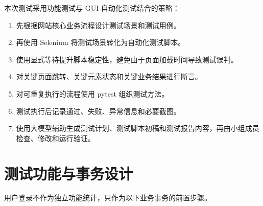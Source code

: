 \documentclass[UTF8,a4paper,12pt]{ctexart}
\begin{document}
本次测试采用功能测试与 GUI 自动化测试结合的策略：

\begin{enumerate}
  \item 先根据网站核心业务流程设计测试场景和测试用例。
  \item 再使用 Selenium 将测试场景转化为自动化测试脚本。
  \item 使用显式等待提升脚本稳定性，避免由于页面加载时间导致测试误判。
  \item 对关键页面跳转、关键元素状态和关键业务结果进行断言。
  \item 对可重复执行的流程使用 pytest 组织测试方法。
  \item 测试执行后记录通过、失败、异常信息和必要截图。
  \item 使用大模型辅助生成测试计划、测试脚本初稿和测试报告内容，再由小组成员检查、修改和运行验证。
\end{enumerate}

\section{测试功能与事务设计}

用户登录不作为独立功能统计，只作为以下业务事务的前置步骤。
\end{document}
